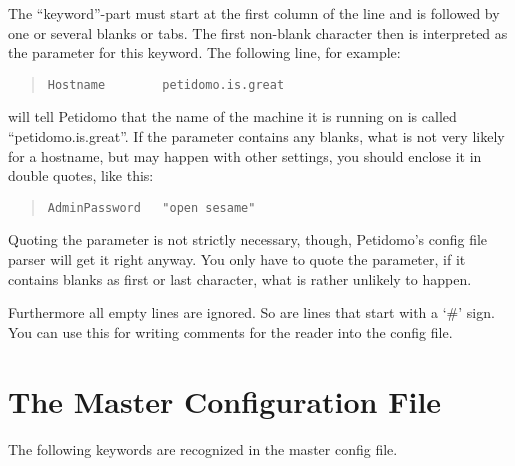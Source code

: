 \documentclass[a4paper,11pt]{scrreprt}
\begin{document}
The ``keyword''-part must start at the first column of the line and is
followed by one or several blanks or tabs. The first non-blank
character then is interpreted as the parameter for this keyword. The
following line, for example:
\begin{quote}
\begin{verbatim}
Hostname        petidomo.is.great
\end{verbatim}
\end{quote}
will tell Petidomo that the name of the machine it is running on is
called ``petidomo.is.great''. If the parameter contains any blanks,
what is not very likely for a hostname, but may happen with other
settings, you should enclose it in double quotes, like this:
\begin{quote}
\begin{verbatim}
AdminPassword   "open sesame"
\end{verbatim}
\end{quote}

Quoting the parameter is not strictly necessary, though, Petidomo's
config file parser will get it right anyway. You only have to quote
the parameter, if it contains blanks as first or last character, what
is rather unlikely to happen.

Furthermore all empty lines are ignored. So are lines that start with
a `\#' sign. You can use this for writing comments for the reader into
the config file.

\section{The Master Configuration File}
\label{master config file}

The following keywords are recognized in the master config file.
\end{document}
